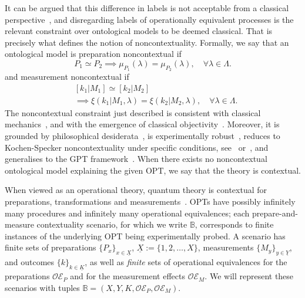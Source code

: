 \documentclass[a4paper,twocolumn,11pt,accepted=2024-01-17]{quantumarticle}
\begin{document}
It can be argued that this difference in labels is not acceptable from a classical perspective~\cite{spekkens2005contextuality,spekkens2019ontological}, and disregarding labels of operationally equivalent processes is the relevant constraint over ontological models to be deemed classical. That is precisely what defines the notion of noncontextuality. Formally, we say that an ontological model is preparation noncontextual if
\begin{equation}\label{eq: prep noncontextuality}
    P_1 \simeq P_2 \implies \mu_{P_1}(\lambda) = \mu_{P_2}(\lambda),\quad \forall \lambda \in \Lambda.
\end{equation}
and measurement noncontextual if {
\begin{align}\label{eq: measurement noncontextuality}
    &[k_1\vert M_1] \simeq [k_2 \vert M_2]\nonumber\\
    &\implies \xi(k_1\vert M_1,\lambda)=\xi(k_2\vert M_2,\lambda),\quad \forall \lambda \in \Lambda.
\end{align}
}
The noncontextual constraint just described is consistent with classical mechanics~\cite[Supp. Material A]{lostaglio_certifying_2020}, and with the emergence of classical objectivity~\cite{baldijao_emergence_2021}. Moreover, it is grounded by philosophical desiderata~\cite{spekkens2019ontological}, is experimentally robust~\cite{mazurek2016experimental,mazurek2021experimentally}, reduces to Kochen-Specker noncontextuality under specific conditions, see~\cite[Section 1.3.2]{kunjwal2016contextuality} or~\cite{leifer2013maximally}, and generalises to the GPT framework~\cite{schmid2021characterization,shahandeh2021contextuality}. When there exists no noncontextual ontological model explaining the given OPT, we say that the theory is contextual. 

When viewed as an operational theory, quantum theory is contextual for preparations, transformations and measurements~\cite{spekkens2005contextuality,banik2014ontological,lillystone2019contextuality,kunjwal2019beyondcabello}. OPTs have possibly infinitely many procedures and infinitely many operational equivalences; each prepare-and-measure contextuality scenario, for which we write $\mathbb{B}$, corresponds to finite instances of the underlying OPT being experimentally probed. A  scenario has finite sets of preparations $\{P_x\}_{x \in \underline{X}}$, $\underline{X} := \{1,2,\dots,X\}$, measurements $\{M_y\}_{y \in \underline{Y}}$, and outcomes $\{k\}_{k \in \underline{K}}$, as well as \textit{finite} sets of operational equivalences for the preparations $\mathcal{OE}_P$ and for the measurement effects $\mathcal{OE}_M$. We will represent these scenarios with tuples $\mathbb{B} = (X,Y,K,\mathcal{OE}_P,\mathcal{OE}_M)$.  
\end{document}
